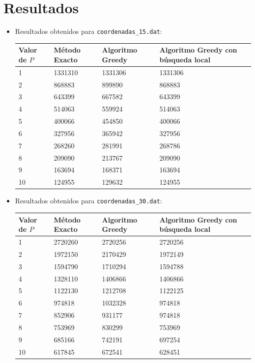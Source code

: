 \documentclass[a4paper,11pt]{article}
\begin{document}
\newpage
\section{Resultados}

\begin{itemize}
\item Resultados obtenidos para \texttt{coordenadas\_15.dat}:

\begin{table}[!htbp]
\label{results_15}
\centering
\begin{tabularx}{\textwidth}{|X|X|X|X|}
\hline
Valor de ${P}$	& Método Exacto	& Algoritmo Greedy & Algoritmo Greedy con búsqueda local \\ \hline
1	& 1331310	& 1331306	& 1331306	\\ \hline
2	& 868883	& 899890	& 868883	\\ \hline
3	& 643399	& 667582	& 643399	\\ \hline
4	& 514063	& 559924	& 514063	\\ \hline
5	& 400066	& 454850	& 400066	\\ \hline
6	& 327956	& 365942	& 327956	\\ \hline
7	& 268260	& 281991	& 268786	\\ \hline
8	& 209090	& 213767	& 209090	\\ \hline
9	& 163694	& 168371	& 163694	\\ \hline
10	& 124955	& 129632	& 124955	\\ \hline
\end{tabularx}
\end{table}

\item Resultados obtenidos para \texttt{coordenadas\_30.dat}:

\begin{table}[!htbp]
\label{results_30}
\centering
\begin{tabularx}{\textwidth}{|X|X|X|X|}
\hline
Valor de ${P}$	& Método Exacto	& Algoritmo Greedy & Algoritmo Greedy con búsqueda local \\ \hline
1	& 2720260	& 2720256	& 2720256	\\ \hline
2	& 1972150	& 2170429	& 1972149	\\ \hline
3	& 1594790	& 1710294	& 1594788	\\ \hline
4	& 1328110	& 1406866	& 1406866	\\ \hline
5	& 1122130	& 1212708	& 1122125	\\ \hline
6	& 974818	& 1032328	& 974818	\\ \hline
7	& 852906	& 931177	& 974818	\\ \hline
8	& 753969	& 830299	& 753969	\\ \hline
9	& 685166	& 742191	& 697254	\\ \hline
10	& 617845	& 672541	& 628451	\\ \hline
\end{tabularx}
\end{table}


\end{itemize}
\end{document}
